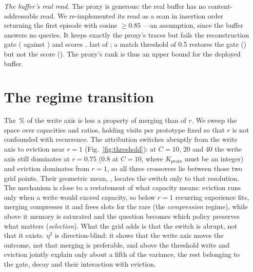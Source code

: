 \documentclass[conference]{IEEEtran}
\begin{document}
\emph{The buffer's real read.} The proxy is generous: the real buffer has no
content-addressable read. We re-implemented its read as a scan in insertion
order returning the first episode with cosine $\geq 0.85$ ---an assumption,
since the buffer answers no queries. It keeps exactly the proxy's traces but
fails the reconstruction gate
(
against )
and scores
,
last of ;
a match threshold of 0.5 restores the gate
()
but not the score
().
The proxy's rank is thus an upper bound for the deployed buffer.

\section{The regime transition}
\label{sec:regime}

The \,\% of the write axis
is less a property of merging than of $r$. We sweep the space over capacities
and ratios, holding visits per prototype fixed so that $r$ is not confounded
with recurrence. The attribution switches abruptly from the write axis to
eviction near $r=1$ (Fig.~\ref{fig:threshold}): at $C=10$, 20 and 40 the
write axis still dominates at $r=0.75$ (0.8 at $C=10$, where $K_{proto}$ must
be an integer) and eviction dominates from $r=1$, so all three crossovers lie
between those two grid points. Their geometric mean,
, locates the switch
only to that resolution. The mechanism is close to a
restatement of what capacity means: eviction runs only when a write would
exceed capacity, so below $r=1$ recurring experience fits, merging compresses
it and frees slots for the rare (the \emph{compression} regime), while above it
memory is saturated and the question becomes which policy preserves what
matters (\emph{selection}). What the grid adds is that the switch is abrupt,
not that it exists. $\eta^2$ is direction-blind: it shows that the write axis
moves the outcome, not that merging is preferable, and above the threshold
write and eviction jointly explain only about a fifth of the variance, the rest
belonging to the gate, decay and their interaction with eviction.
\end{document}
